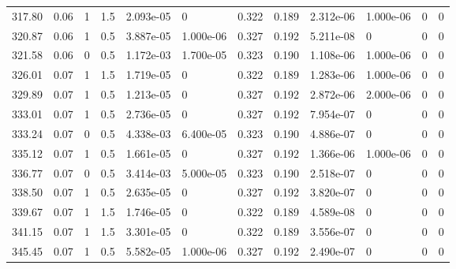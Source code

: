 \documentclass[preview]{standalone}
\begin{document}
{{{\begin{tabular}{L{1.2cm}C{1.2cm} C{0.3cm}C{0.5cm} C{1.4cm}C{1.4cm} C{1.4cm}C{1.4cm} C{1.6cm}C{1.6cm} C{1.6cm}C{1.6cm}}
  317.80  &  0.06  & 1     & 1.5 &  2.093e-05  & 0  &  0.322&   0.189& 2.312e-06 & 1.000e-06   &  0 & 0  \\ 
  320.87  &  0.06  & 1     & 0.5 &  3.887e-05  & 1.000e-06  &  0.327&   0.192& 5.211e-08 & 0   &  0 & 0  \\ 
  321.58  &  0.06  & 0     & 0.5 &  1.172e-03  & 1.700e-05  &  0.323&   0.190& 1.108e-06 & 1.000e-06   &  0 & 0  \\ 
  326.01  &  0.07  & 1     & 1.5 &  1.719e-05  & 0  &  0.322&   0.189& 1.283e-06 & 1.000e-06   &  0 & 0  \\ 
  329.89  &  0.07  & 1     & 0.5 &  1.213e-05  & 0  &  0.327&   0.192& 2.872e-06 & 2.000e-06   &  0 & 0  \\ 
  333.01  &  0.07  & 1     & 0.5 &  2.736e-05  & 0  &  0.327&   0.192& 7.954e-07 & 0   &  0 & 0  \\ 
  333.24  &  0.07  & 0     & 0.5 &  4.338e-03  & 6.400e-05  &  0.323&   0.190& 4.886e-07 & 0   &  0 & 0  \\ 
  335.12  &  0.07  & 1     & 0.5 &  1.661e-05  & 0  &  0.327&   0.192& 1.366e-06 & 1.000e-06   &  0 & 0  \\ 
  336.77  &  0.07  & 0     & 0.5 &  3.414e-03  & 5.000e-05  &  0.323&   0.190& 2.518e-07 & 0   &  0 & 0  \\ 
  338.50  &  0.07  & 1     & 0.5 &  2.635e-05  & 0  &  0.327&   0.192& 3.820e-07 & 0   &  0 & 0  \\ 
  339.67  &  0.07  & 1     & 1.5 &  1.746e-05  & 0  &  0.322&   0.189& 4.589e-08 & 0   &  0 & 0  \\ 
  341.15  &  0.07  & 1     & 1.5 &  3.301e-05  & 0  &  0.322&   0.189& 3.556e-07 & 0   &  0 & 0  \\ 
  345.45  &  0.07  & 1     & 0.5 &  5.582e-05  & 1.000e-06  &  0.327&   0.192& 2.490e-07 & 0   &  0 & 0  \\ 
\hline 
\end{tabular} 

}}}
\end{document}

